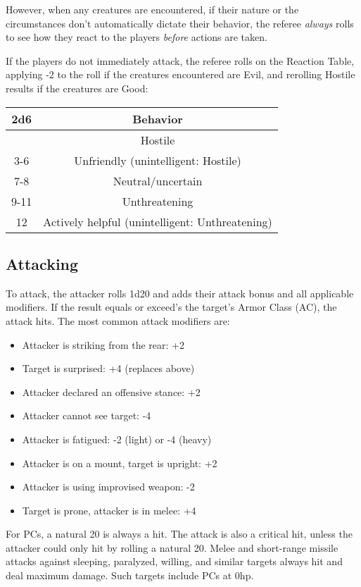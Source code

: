 \documentclass{article}
\begin{document}
\begin{multicols}{2}
However, when any creatures are encountered, if their nature or the
circumstances don't automatically dictate their behavior, the referee
\emph{always} rolls to see how they react to the players \emph{before}
actions are taken.

If the players do not immediately attack, the referee rolls on the
Reaction Table, applying -2 to the roll if the creatures encountered are
Evil, and rerolling Hostile results if the creatures are Good:

\begin{longtable}[]{@{}cc@{}}
\toprule\noalign{}
2d6 & Behavior \\
\midrule\noalign{}
\endhead
\bottomrule\noalign{}
\endlastfoot
2 & Hostile \\
3-6 & Unfriendly (unintelligent: Hostile) \\
7-8 & Neutral/uncertain \\
9-11 & Unthreatening \\
12 & Actively helpful (unintelligent: Unthreatening) \\
\end{longtable}

\subsection{Attacking}\label{attacking}

To attack, the attacker rolls 1d20 and adds their attack bonus and all
applicable modifiers. If the result equals or exceed's the target's
Armor Class (AC), the attack hits. The most common attack modifiers are:

\begin{itemize}
\tightlist
\item
  Attacker is striking from the rear: +2
\item
  Target is surprised: +4 (replaces above)
\item
  Attacker declared an offensive stance: +2
\item
  Attacker cannot see target: -4
\item
  Attacker is fatigued: -2 (light) or -4 (heavy)
\item
  Attacker is on a mount, target is upright: +2
\item
  Attacker is using improvised weapon: -2
\item
  Target is prone, attacker is in melee: +4
\end{itemize}

For PCs, a natural 20 is always a hit. The attack is also a critical
hit, unless the attacker could only hit by rolling a natural 20. Melee
and short-range missile attacks against sleeping, paralyzed, willing,
and similar targets always hit and deal maximum damage. Such targets
include PCs at 0hp.


\end{multicols}
\end{document}
